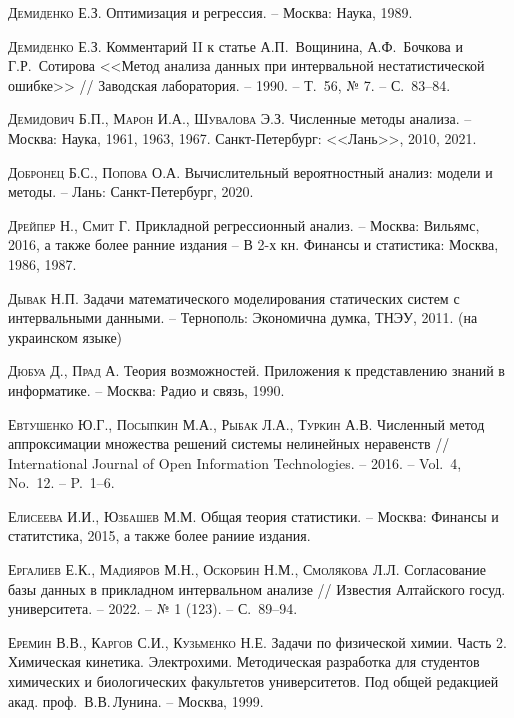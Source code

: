 \documentclass[a5paper,openany]{book}
\begin{document}
\begin{thebibliography}{999}
\textsc{Демиденко Е.З.} Оптимизация и регрессия. -- Москва: Наука, 1989. 
  
\textsc{Демиденко Е.З.} Комментарий II к статье А.П.~Вощинина, А.Ф.~Бочкова 
и Г.Р.~Сотирова <<Метод анализа данных при интервальной нестатистической ошибке>> // 
Заводская лаборатория. -- 1990. -- Т.~56, № 7. -- С.~83--84. 
  
\textsc{Демидович Б.П., Марон И.А., Шувалова Э.З.} Численные методы анализа. -- 
Москва: Наука, 1961, 1963, 1967. Санкт-Петербург: <<Лань>>, 2010, 2021. 
  
\textsc{Добронец Б.С., Попова О.А.} Вычислительный вероятностный анализ: модели 
и методы. -- Лань: Санкт-Петербург, 2020. 
  
\textsc{Дрейпер Н., Смит Г.} Прикладной регрессионный анализ. -- Москва: Вильямс, 2016, 
а также более ранние издания -- В 2-х кн. Финансы и статистика: Москва, 1986, 1987.  
  
\textsc{Дывак Н.П.} Задачи математического моделирования статических систем 
с интервальными данными. -- Тернополь: Экономична думка, ТНЭУ, 2011. 
(на украинском языке) 
  
\textsc{Дюбуа Д., Прад А.} Теория возможностей. Приложения к представлению знаний  
в информатике. -- Москва: Радио и связь, 1990. 
  
\textsc{Евтушенко Ю.Г., Посыпкин М.А., Рыбак Л.А., Туркин А.В.} Численный метод 
аппроксимации множества решений системы нелинейных неравенств // International Journal 
of Open Information Technologies. -- 2016. -- Vol.~4, No.~12. -- P.~1--6. 
  
\textsc{Елисеева И.И., Юзбашев М.М.} Общая теория статистики. -- Москва: Финансы 
и статитстика, 2015, а также более раниие издания. 
  
\textsc{Ергалиев Е.К., Мадияров М.Н., Оскорбин Н.М., Смолякова Л.Л.} Согласование 
базы данных в прикладном интервальном анализе // Известия Алтайского госуд. 
университета. -- 2022. -- № 1 (123). -- С.~89--94.  \ 
  
\textsc{Еремин В.В., Каргов С.И., Кузьменко Н.Е.} Задачи по физической химии. 
Часть 2. Химическая кинетика. Электрохими. Методическая разработка для студентов 
химических и биологических факультетов университетов. Под общей редакцией акад. 
проф.~В.В.\,Лунина. -- Москва, 1999. 
  

\end{thebibliography}
\end{document}
